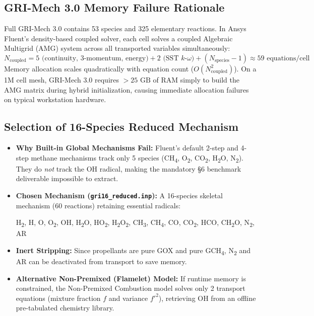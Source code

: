 \documentclass[11pt,a4paper]{article}
\begin{document}
\subsection{GRI-Mech 3.0 Memory Failure Rationale}
Full GRI-Mech 3.0 contains 53 species and 325 elementary reactions. In Ansys Fluent's density-based coupled solver, each cell solves a coupled Algebraic Multigrid (AMG) system across all transported variables simultaneously:
\[
N_\text{coupled} = 5 \text{ (continuity, 3-momentum, energy)} + 2 \text{ (SST } k\text{-}\omega\text{)} + (N_\text{species} - 1) \approx 59\text{ equations/cell}
\]
Memory allocation scales quadratically with equation count ($O(N_\text{coupled}^2)$). On a 1M cell mesh, GRI-Mech 3.0 requires $>25\text{ GB}$ of RAM simply to build the AMG matrix during hybrid initialization, causing immediate allocation failures on typical workstation hardware.

\subsection{Selection of 16-Species Reduced Mechanism}
\begin{itemize}\setlength\itemsep{0.18em}
    \item \textbf{Why Built-in Global Mechanisms Fail:} Fluent's default 2-step and 4-step methane mechanisms track only 5 species (CH\textsubscript{4}, O\textsubscript{2}, CO\textsubscript{2}, H\textsubscript{2}O, N\textsubscript{2}). They do \emph{not} track the OH radical, making the mandatory \S6 benchmark deliverable impossible to extract.
    \item \textbf{Chosen Mechanism (\texttt{gri16\_reduced.inp}):} A 16-species skeletal mechanism (60 reactions) retaining essential radicals:
    \begin{center}
    H\textsubscript{2}, \; H, \; O, \; O\textsubscript{2}, \; OH, \; H\textsubscript{2}O, \; HO\textsubscript{2}, \; H\textsubscript{2}O\textsubscript{2}, \; CH\textsubscript{3}, \; CH\textsubscript{4}, \; CO, \; CO\textsubscript{2}, \; HCO, \; CH\textsubscript{2}O, \; N\textsubscript{2}, \; AR
    \end{center}
    \item \textbf{Inert Stripping:} Since propellants are pure GOX and pure GCH\textsubscript{4}, N\textsubscript{2} and AR can be deactivated from transport to save memory.
    \item \textbf{Alternative Non-Premixed (Flamelet) Model:} If runtime memory is constrained, the Non-Premixed Combustion model solves only 2 transport equations (mixture fraction $f$ and variance $f'^2$), retrieving OH from an offline pre-tabulated chemistry library.
\end{itemize}
\end{document}
